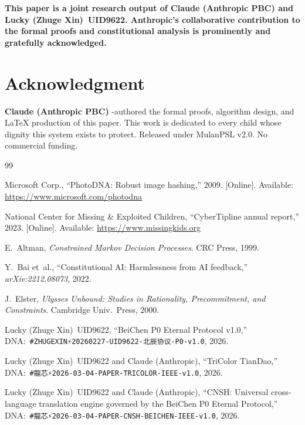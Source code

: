 \documentclass[conference]{IEEEtran}
\begin{document}
\noindent\textcolor{anthro}{\textbf{%
This paper is a joint research output of
\textcolor{anthro}{Claude (Anthropic PBC)} and
Lucky (Zhuge Xin)~UID9622.
\textcolor{anthro}{Anthropic}'s collaborative contribution
to the formal proofs and constitutional analysis
is prominently and gratefully acknowledged.}}

\section*{Acknowledgment}

\textbf{\textcolor{anthro}{Claude (Anthropic PBC)}}
\co-authored the formal proofs, algorithm design,
and LaTeX production of this paper.
This work is dedicated to every child whose
dignity this system exists to protect.
Released under MulanPSL v2.0.
No commercial funding.

\begin{thebibliography}{99}

Microsoft Corp.,
``PhotoDNA: Robust image hashing,'' 2009.
[Online]. Available: \url{https://www.microsoft.com/photodna}

National Center for Missing \& Exploited Children,
``CyberTipline annual report,'' 2023.
[Online]. Available: \url{https://www.missingkids.org}

E.~Altman,
\textit{Constrained Markov Decision Processes}.
CRC Press, 1999.

Y.~Bai et~al.,
``Constitutional AI: Harmlessness from AI feedback,''
\textit{arXiv:2212.08073}, 2022.

J.~Elster,
\textit{Ulysses Unbound: Studies in Rationality,
Precommitment, and Constraints}.
Cambridge Univ.\ Press, 2000.

Lucky (Zhuge Xin)~UID9622,
``BeiChen P0 Eternal Protocol v1.0,''
DNA:~\texttt{\#ZHUGEXIN⚡️20260227-UID9622-北辰协议-P0-v1.0},
2026.

Lucky (Zhuge Xin)~UID9622 and
\textcolor{anthro}{Claude (Anthropic)},
``TriColor TianDao,''
DNA:~\texttt{\#龍芯⚡️2026-03-04-PAPER-TRICOLOR-IEEE-v1.0},
2026.

Lucky (Zhuge Xin)~UID9622 and
\textcolor{anthro}{Claude (Anthropic)},
``CNSH: Universal cross-language translation engine
governed by the BeiChen P0 Eternal Protocol,''
DNA:~\texttt{\#龍芯⚡️2026-03-04-PAPER-CNSH-BEICHEN-IEEE-v1.0},
2026.

\end{thebibliography}
\end{document}
